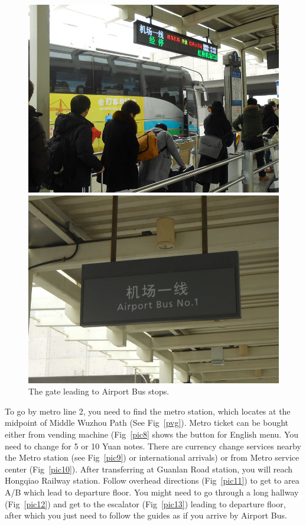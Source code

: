 \documentclass[11pt]{article}
\begin{document}
\begin{figure}[!h]
	\begin{minipage}[t]{.5\textwidth}
     	\centering
        	\includegraphics{image018.jpg}
	\end{minipage}%
     \begin{minipage}[t]{.5\textwidth}
         \centering
         \includegraphics[scale=1.0]{image020.jpg}
    \end{minipage}%
	\caption{The gate leading to Airport Bus stops.\label{pic7}}
 \end{figure}

To go by metro line 2, you need to find the metro station, which locates at the midpoint of Middle Wuzhou Path 
(See Fig~\ref{pvg}). Metro ticket can be bought either from vending machine (Fig~\ref{pic8} shows the button
 for English menu. You need to change for 5 or 10 Yuan notes. There are currency change services nearby 
 the Metro station (see Fig~\ref{pic9}) or international arrivals) or from Metro service center (Fig~\ref{pic10}).
 After transferring at Guanlan Road station, you will reach Hongqiao Railway station. Follow overhead 
 directions (Fig~\ref{pic11}) to get to area A/B which lead to departure floor. You might need to go through 
 a long hallway (Fig~\ref{pic12}) and get to the escalator (Fig~\ref{pic13}) leading to departure floor,
  after which you just need to follow the guides as if you arrive by Airport Bus.
  
\end{document}
